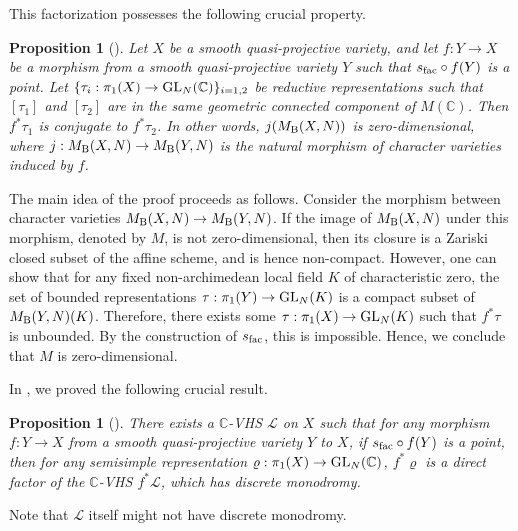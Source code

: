 \documentclass[english]{amsproc}
\theoremstyle{plain}
\newtheorem{proposition}[thm]{Proposition}
\theoremstyle{definition}
\theoremstyle{remark}
\theoremstyle{plain}
\numberwithin{equation}{thm} %
\newcommand{\cL}{\mathcal L}
\newcommand{\bC}{\mathbb{C}}
\newcommand{\GL}{{\rm GL}}
\begin{document}
This factorization possesses the following crucial property.

\begin{proposition}[{\cite[Proposition 3.10]{DY23}}]\label{lem:conjugate3}
	Let $X$ be a smooth quasi-projective variety, and let $f:Y\to X$ be a morphism from a smooth quasi-projective variety $Y$ such that $s_{\rm fac}\circ f(Y)$ is a point. Let $\{\tau_i:\pi_1(X)\to {\rm GL}_N(\bC)\}_{i=1,2}$ be reductive representations such that $[\tau_1]$ and $[\tau_2]$ are in the same geometric connected component of $M(\bC)$. Then $f^*\tau_1 $ is conjugate to $f^*\tau_2 $. In other words, $j(M_{\rm B}(X,N))$ is zero-dimensional, where $j:M_{\rm B}(X,N)\to M_{\rm B}(Y,N)$ is the natural morphism of character varieties induced by $f$.
\end{proposition}

The main idea of the proof proceeds as follows. Consider the morphism between character varieties $M_{\rm B}(X,N)\to M_{\rm B}(Y,N)$. If the image of $M_{\rm B}(X,N)$ under this morphism, denoted by $M$, is not zero-dimensional, then its closure is a Zariski closed subset of the affine scheme, and is hence non-compact. However, one can show that for any fixed non-archimedean local field $K$ of characteristic zero, the set of bounded representations $\tau:\pi_1(Y)\to \GL_N(K)$ is a compact subset of $M_{\rm B}(Y,N)(K)$. Therefore, there exists some $\tau:\pi_1(X)\to \GL_{N}(K)$ such that $f^*\tau$ is unbounded. By the construction of $s_{\rm fac}$, this is impossible. Hence, we conclude that $M$ is zero-dimensional.


In \cite{DY23}, we proved the following crucial result.
\begin{proposition}[{\cite[Proposition 3.13]{DY23}}]\label{prop:cons}
	There exists a $\bC$-VHS $\cL$ on $X$ such that for any morphism $f:Y\to X$ from a smooth quasi-projective variety $Y$ to $X$, if $s_{\rm fac}\circ f(Y)$ is a point, then for any semisimple representation $\varrho:\pi_1(X)\to \GL_{N}(\bC)$,  $f^*\varrho$ is a direct factor of the $\bC$-VHS $f^*\cL$, which has discrete monodromy.
\end{proposition}

Note that $\cL$ itself might not have discrete monodromy.
\end{document}
